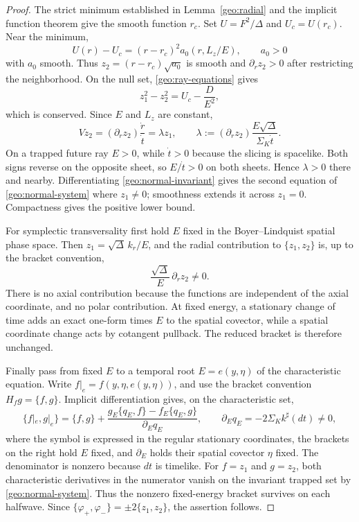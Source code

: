 \begin{proof}
The strict minimum established in Lemma~\ref{geo:radial} and the
implicit function theorem give the smooth function $r_c$.  Set
$U=F^2/\Delta$ and $U_c=U(r_c)$.  Near the minimum,
\[
 U(r)-U_c=(r-r_c)^2 a_0(r,L_z/E),\qquad a_0>0
\]
with $a_0$ smooth.  Thus $z_2=(r-r_c)\sqrt{a_0}$ is smooth and
$\partial_rz_2>0$ after restricting the neighborhood.  On the null
set, \eqref{geo:ray-equations} gives
\begin{equation}
 z_1^2-z_2^2=U_c-\frac{D}{E^2},
 \label{geo:normal-invariant}
\end{equation}
which is conserved.  Since $E$ and $L_z$ are constant,
\[
 Vz_2=(\partial_rz_2)\frac{\dot r}{\dot t}=\lambda z_1,
 \qquad
 \lambda:=(\partial_rz_2)\frac{E\sqrt\Delta}{\Sigma_K\dot t}.
\]
On a trapped future ray $E>0$, while $\dot t>0$ because the slicing
is spacelike.  Both signs reverse on the opposite sheet, so
$E/\dot t>0$ on both sheets.  Hence $\lambda>0$ there and nearby.
Differentiating \eqref{geo:normal-invariant} gives the second equation
of \eqref{geo:normal-system} where $z_1\neq0$; smoothness extends it
across $z_1=0$.  Compactness gives the positive lower bound.

For symplectic transversality first hold $E$ fixed in the
Boyer--Lindquist spatial phase space.  Then
$z_1=\sqrt\Delta\,k_r/E$, and the radial contribution to
$\{z_1,z_2\}$ is, up to the bracket convention,
\[
 \frac{\sqrt\Delta}{E}\,\partial_rz_2\neq0.
\]
There is no axial contribution because the functions are independent
of the axial coordinate, and no polar contribution.  At fixed energy,
a stationary change of time adds an exact one-form times $E$ to the
spatial covector, while a spatial coordinate change acts by cotangent
pullback.  The reduced bracket is therefore unchanged.

Finally pass from fixed $E$ to a temporal root $E=e(y,\eta)$ of the
characteristic equation.  Write $f|_e=f(y,\eta,e(y,\eta))$, and use
the bracket convention $H_f g=\{f,g\}$.  Implicit differentiation
gives, on the characteristic set,
\begin{equation}
 \{f|_e,g|_e\}
 =\{f,g\}
   +\frac{g_E\{q_E,f\}-f_E\{q_E,g\}}{\partial_E q_E},
 \qquad \partial_Eq_E=-2\Sigma_K k^\sharp(dt)\neq0,
 \label{geo:root-bracket}
\end{equation}
where the symbol is expressed in the regular stationary coordinates,
the brackets on the right hold $E$ fixed, and $\partial_E$ holds
their spatial covector $\eta$ fixed.  The denominator is nonzero
because $dt$ is timelike.  For $f=z_1$ and $g=z_2$, both
characteristic derivatives in the numerator vanish on the invariant
trapped set by \eqref{geo:normal-system}.  Thus the nonzero
fixed-energy bracket survives on each halfwave.  Since
$\{\varphi_+,\varphi_-\}=\pm2\{z_1,z_2\}$, the assertion follows.
\end{proof}

